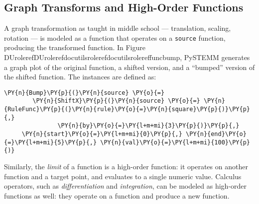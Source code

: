 \documentclass[letterpaper,compsoc,twoside]{IEEEtran}
\makeatletter
\def\PY@reset{\let\PY@it=\relax \let\PY@bf=\relax \let\PY@ul=\relax \let\PY@tc=\relax \let\PY@bc=\relax \let\PY@ff=\relax}
\def\PY@tok#1{\csname PY@tok@#1\endcsname}
\def\PY@toks#1+{\ifx\relax#1\empty\else \PY@tok{#1}\expandafter\PY@toks\fi}
\def\PY@do#1{\PY@bc{\PY@tc{\PY@ul{\PY@it{\PY@bf{\PY@ff{#1}}}}}}}
\def\PY#1#2{\PY@reset\PY@toks#1+\relax+\PY@do{#2}}
\providecommand*{\DUrole}[2]{\ifcsname DUrole#1\endcsname \csname DUrole#1\endcsname{#2}\else \ifcsname docutilsrole#1\endcsname \csname docutilsrole#1\endcsname{#2}\else #2\fi \fi }
\makeatother
\begin{document}
\subsection{Graph Transforms and High-Order Functions\label{graph-transforms-and-high-order-functions}}
\begin{figure*}[]\noindent{}
\caption{Function Transforms: A \texttt{Bump} of a \texttt{Shift} of $x^{2}$. \DUrole{label}{funcbump}}
\end{figure*}

A graph transformation as taught in middle school — translation, scaling,  rotation — is modeled as a function that operates on a \texttt{source} function, producing the transformed function. In Figure \DUrole{ref}{funcbump}, PySTEMM generates a graph plot of the original function, a shifted version, and a “bumped” version of the shifted function. The instances are defined as:
\begin{Verbatim}[commandchars=\\\{\},fontsize=\footnotesize]
\PY{n}{Bump}\PY{p}{(}\PY{n}{source} \PY{o}{=}
        \PY{n}{ShiftX}\PY{p}{(}\PY{n}{source} \PY{o}{=} \PY{n}{RuleFunc}\PY{p}{(}\PY{n}{rule}\PY{o}{=}\PY{n}{square}\PY{p}{)}\PY{p}{,}
               \PY{n}{by}\PY{o}{=}\PY{l+m+mi}{3}\PY{p}{)}\PY{p}{,}
     \PY{n}{start}\PY{o}{=}\PY{l+m+mi}{0}\PY{p}{,} \PY{n}{end}\PY{o}{=}\PY{l+m+mi}{5}\PY{p}{,} \PY{n}{val}\PY{o}{=}\PY{l+m+mi}{100}\PY{p}{)}
\end{Verbatim}
Similarly, the \emph{limit} of a function is a high-order function: it operates on another function and a target point, and evaluates to a single numeric value. Calculus operators, such as \emph{differentiation} and \emph{integration}, can be modeled as high-order functions as well: they operate on a function and produce a new function.
\end{document}
